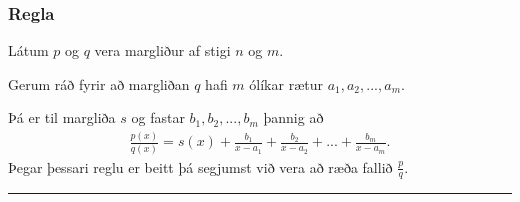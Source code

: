 \documentclass[a4paper,10pt,icelandic]{sphinxmanual}
\begin{document}
\subsubsection{Regla}
\label{\detokenize{Kafli09:id5}}
Látum \(p\) og \(q\) vera margliður af stigi \(n\) og \(m\).

Gerum ráð fyrir að margliðan \(q\) hafi \(m\) ólíkar rætur \(a_1,a_2,...,a_m\).

Þá er til margliða \(s\) og fastar \(b_1,b_2,...,b_m\) þannig að
\begin{equation*}
\begin{split}\frac{p(x)}{q(x)}=s(x)+\frac{b_1}{x-a_1}+\frac{b_2}{x-a_2}+...+\frac{b_m}{x-a_m}.\end{split}
\end{equation*}
Þegar þessari reglu er beitt þá segjumst við vera að  ræða fallið \(\frac{p}{q}\).


\bigskip\hrule\bigskip
\end{document}
